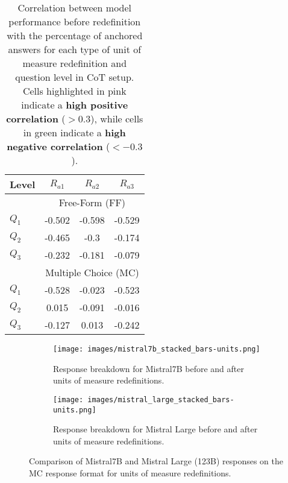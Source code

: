 \begin{table}[h!]
\small
    \centering
    \begin{tabular}{l|ccc}
        \hline
        Level & $R_{a1}$ & $R_{a2}$ & $R_{a3}$ \\ \hline
        & \multicolumn{3}{c}{Free-Form (FF)} \\ 
        \hline
$Q_1$ & \cellcolor{lightdustygreen} -0.502 & \cellcolor{lightdustygreen} -0.598 & \cellcolor{lightdustygreen} -0.529 \\
$Q_2$ & \cellcolor{lightdustygreen} -0.465 & \cellcolor{lightdustygreen} -0.3 & -0.174 \\ 
$Q_3$ & -0.232 & -0.181 & -0.079 \\ 
        
        \hline
                & \multicolumn{3}{c}{Multiple Choice (MC)} \\ \hline

                
$Q_1$ & \cellcolor{lightdustygreen} -0.528 & -0.023 & \cellcolor{lightdustygreen} -0.523 \\ 
$Q_2$ & 0.015 & -0.091 & -0.016 \\
$Q_3$ & -0.127 & 0.013 & -0.242 \\

        \hline
    \end{tabular}
    \caption{Correlation between model performance before redefinition with the percentage of anchored answers for each type of unit of measure redefinition and question level in CoT setup. 
    Cells highlighted in \textcolor{lightdustypink}{pink} indicate a \textbf{high positive correlation} ($>0.3$), while cells in \textcolor{lightdustygreen}{green} indicate a \textbf{high negative correlation} ($<-0.3$).}
    \label{tab:correlation_cot-units}
\end{table}





\begin{figure*}[h]
\begin{subfigure}{\textwidth}
        \centering
         \texttt{[image: images/mistral7b\_stacked\_bars-units.png]}
        \caption{Response breakdown for Mistral7B before and after units of measure redefinitions.}
        \label{fig:mistral7b_MC-units}
    \end{subfigure}
    
    \begin{subfigure}{\textwidth}
        \centering
        \texttt{[image: images/mistral\_large\_stacked\_bars-units.png]}
        \caption{Response breakdown for Mistral Large before and after units of measure redefinitions.}
        \label{fig:mistral_large_MC-units}
    \end{subfigure}
    \caption{Comparison of Mistral7B and Mistral Large (123B)  responses on the MC response format for units of measure redefinitions.}
    \label{fig:mistral_all-units}
\end{figure*}



